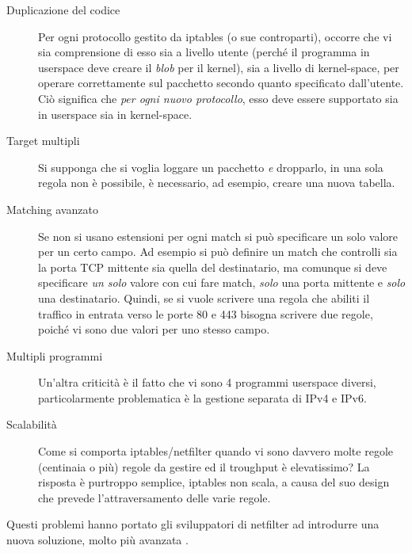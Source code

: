 \begin{description}
  \item[Duplicazione del codice]Per ogni protocollo gestito da iptables (o sue
  controparti), occorre che vi sia comprensione di esso sia a livello
  utente (perché il programma in userspace deve creare il \textit{blob} per
  il kernel), sia a livello di kernel-space, per operare correttamente sul pacchetto
  secondo quanto specificato dall'utente.\\
  Ciò significa che \textit{per ogni nuovo protocollo}, esso deve essere
  supportato sia in userspace sia in kernel-space.
  \item[Target multipli]Si supponga che si voglia loggare un pacchetto
  \textit{e} dropparlo, in una sola regola non è possibile, è necessario, ad
  esempio, creare una nuova tabella.
  \item[Matching avanzato]Se non si usano estensioni per ogni match si può specificare
  un solo valore per un certo campo. Ad esempio si può definire un match che controlli
  sia la porta TCP mittente sia quella del destinatario, ma comunque si
  deve specificare \textit{un solo} valore con cui fare match, \textit{solo} una porta mittente
  e \textit{solo} una destinatario.
  Quindi, se si vuole scrivere una regola che abiliti il traffico in entrata verso
  le porte 80 e 443 bisogna scrivere due regole, poiché vi sono due valori per uno stesso campo.
  \item[Multipli programmi]Un'altra criticità è il fatto che vi sono 4 programmi
  userspace diversi, particolarmente problematica è la gestione separata di IPv4
  e IPv6.
  \item[Scalabilità]Come si comporta iptables/netfilter quando vi sono
  davvero molte regole (centinaia o più) regole da gestire ed il troughput
  è elevatissimo? La risposta è purtroppo semplice, iptables non scala, a causa
  del suo design che prevede l'attraversamento delle varie regole.
\end{description}

Questi problemi hanno portato gli sviluppatori di netfilter ad introdurre
una nuova soluzione, molto più avanzata \cite{nftables-pro}.
